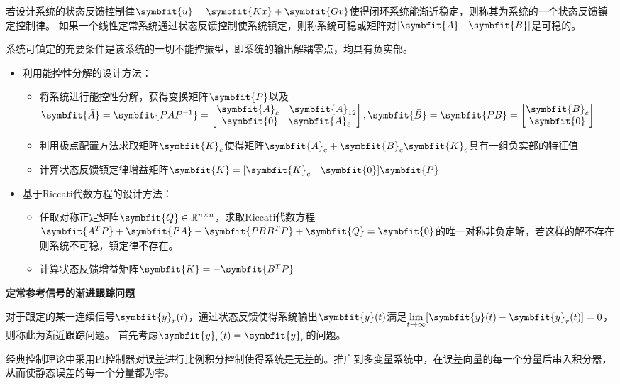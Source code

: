 \documentclass[11pt,a4paper]{ctexart}
\newcommand{\bm}{\symbfit}
\begin{document}
        若设计系统的状态反馈控制律$\bm{u}=\bm{Kx}+\bm{Gv}$使得闭环系统能渐近稳定，则称其为系统的一个状态反馈镇定控制律。
        如果一个线性定常系统通过状态反馈控制使系统镇定，则称系统可稳或矩阵对$[\bm{A}\quad\bm{B}]$是可稳的。

        系统可镇定的充要条件是该系统的一切不能控振型，即系统的输出解耦零点，均具有负实部。

        \begin{itemize}
            \item 利用能控性分解的设计方法：
            \begin{itemize}
                \item 将系统进行能控性分解，获得变换矩阵$\bm{P}$以及
                $\bm{\bar A}=\bm{PAP^{-1}}=\begin{bmatrix}\bm{A}_c\quad \bm{A}_{12}\\ \bm{0}\quad\bm{A}_{\bar c}\end{bmatrix},\bm{\bar B}=\bm{PB}=\begin{bmatrix}\bm{B}_c\\ \bm{0}\end{bmatrix}$
                \item 利用极点配置方法求取矩阵$\bm{K}_c$使得矩阵$\bm{A}_c+\bm{B}_c\bm{K}_c$具有一组负实部的特征值
                \item 计算状态反馈镇定律增益矩阵$\bm{K}=[\bm{K}_c\quad\bm{0}]\bm{P}$
            \end{itemize}

            \item 基于Riccati代数方程的设计方法：
            \begin{itemize}
                \item 任取对称正定矩阵$\bm{Q}\in\mathbb{R}^{n\times n}$，求取Riccati代数方程$\bm{A^TP}+\bm{PA}-\bm{PBB^TP}+\bm{Q}=\bm{0}$的唯一对称非负定解，若这样的解不存在则系统不可稳，镇定律不存在。
                \item 计算状态反馈增益矩阵$\bm{K}=-\bm{B^TP}$
            \end{itemize}
        \end{itemize}
        
        {\setlength{\parindent}{0pt}\textbf{定常参考信号的渐进跟踪问题}}

        对于跟定的某一连续信号$\bm{y}_r(t)$，通过状态反馈使得系统输出$\bm{y}(t)$满足$\lim\limits_{t\rightarrow\infty}[\bm{y}(t)-\bm{y}_r(t)]=0$，则称此为渐近跟踪问题。
        首先考虑$\bm{y}_r(t)=\bm{y}_r$的问题。

        经典控制理论中采用PI控制器对误差进行比例积分控制使得系统是无差的。推广到多变量系统中，在误差向量的每一个分量后串入积分器，从而使静态误差的每一个分量都为零。
\end{document}
